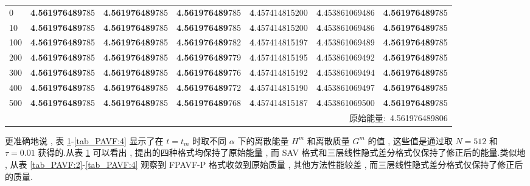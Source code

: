 \begin{table}[H]
\begin{tabular}{lllllll}
	\midrule
	0     &\textbf{4.561976489}785   &\textbf{4.561976489}785   &\textbf{4.561976489}785   &\textbf{4}.457414815200   &\textbf{4}.453861069486   &\textbf{4.561976489}785 \\
	10    &\textbf{4.561976489}785   &\textbf{4.561976489}785   &\textbf{4.561976489}785   &\textbf{4}.457414815200   &\textbf{4}.453861069486   &\textbf{4.561976489}785 \\
	100   &\textbf{4.561976489}785   &\textbf{4.561976489}785   &\textbf{4.561976489}782   &\textbf{4}.457414815197   &\textbf{4}.453861069489   &\textbf{4.561976489}785 \\
	200   &\textbf{4.561976489}785   &\textbf{4.561976489}785   &\textbf{4.561976489}779   &\textbf{4}.457414815195   &\textbf{4}.453861069492   &\textbf{4.561976489}785 \\
	300   &\textbf{4.561976489}785   &\textbf{4.561976489}785   &\textbf{4.561976489}776   &\textbf{4}.457414815192   &\textbf{4}.453861069494   &\textbf{4.561976489}785 \\
	400   &\textbf{4.561976489}785   &\textbf{4.561976489}785   &\textbf{4.561976489}772   &\textbf{4}.457414815190   &\textbf{4}.453861069497   &\textbf{4.561976489}785 \\
	500   &\textbf{4.561976489}785   &\textbf{4.561976489}785   &\textbf{4.561976489}768   &\textbf{4}.457414815187   &\textbf{4}.453861069500   &\textbf{4.561976489}785 \\
	\midrule
	  \multicolumn{7}{r}{原始能量:~4.561976489806} \\
	  \bottomrule
	  \end{tabular}\label{tab_PAVF:1}%
  \end{table}%

  更准确地说 , 表 \ref{tab_PAVF:1}-\ref{tab_PAVF:4} 显示了在 $t=t_{m}$ 时取不同 $\alpha$ 下的离散能量 $H^{m}$ 和离散质量 $G^{m}$ 的值 , 
  这些值是通过取 $N=512$ 和 $\tau=0.01$ 获得的.从表 \ref{tab_PAVF:1} 可以看出 , 提出的四种格式均保持了原始能量 , 
  而 SAV 格式和三层线性隐式差分格式仅保持了修正后的能量.类似地 , 从表 \ref{tab_PAVF:2}-\ref{tab_PAVF:4} 观察到 FPAVF-P 格式收敛到原始质量 , 其他方法性能较差 , 而三层线性隐式差分格式仅保持了修正后的质量.

